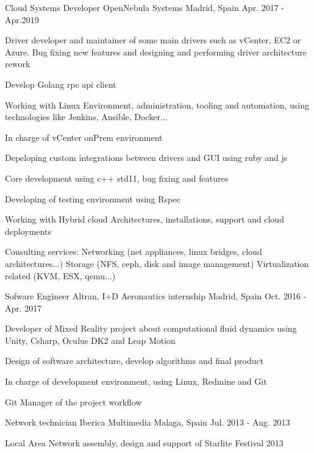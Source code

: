 \begin{cventries}
  \cventry
    {Cloud Systems Developer} %
    {OpenNebula Systems} %
    {Madrid, Spain} %
    {Apr. 2017 - Apr.2019} %
    {
      \begin{cvitems} %
        \item {Driver developer and maintainer of some main drivers such as vCenter, EC2 or Azure. Bug fixing new features and designing and performing driver architecture rework}
        \item {Develop Golang rpc api client}
        \item {Working with Linux Environment, administration, tooling and automation, using technologies like Jenkins, Ansible, Docker...}
        \item {In charge of vCenter onPrem environment}
        \item {Depeloping custom integrations between drivers and GUI using ruby and js}
        \item {Core development using c++ std11, bug fixing and features}
        \item {Developing of testing environment using Rspec}
        \item {Working with Hybrid cloud Architectures, installations, support and cloud deployments}
        \item {Consulting services: Networking (net appliances, linux bridges, cloud architectures...) Storage (NFS, ceph, disk and image management) Virtualization related (KVM, ESX, qemu...)}
      \end{cvitems}
    }

  \cventry
    {Sofware Engineer} %
    {Altran, I+D Aeronautics internship} %
    {Madrid, Spain} %
    {Oct. 2016 - Apr. 2017} %
    {
      \begin{cvitems} %
        \item {Developer of Mixed Reality project about computational fluid dynamics using Unity, Csharp, Oculus DK2 and Leap Motion}
        \item {Design of software architecture, develop algorithms and final product}
        \item {In charge of development environment, using Linux, Redmine and Git}
        \item {Git Manager of the project workflow}
      \end{cvitems}
    }

  \cventry
    {Network technician} %
    {Iberica Multimedia} %
    {Malaga, Spain} %
    {Jul. 2013 - Aug. 2013} %
    {
      \begin{cvitems} %
        \item {Local Area Network assembly, design and support of Starlite Festival 2013}
      \end{cvitems}
    }

\end{cventries}
